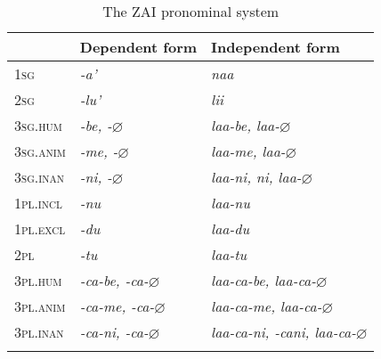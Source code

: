  \begin{table}
 \label{izpronounstable}
 \caption{The ZAI pronominal system}

\begin{tabular}{ l ll }
\lsptoprule
 & Dependent form & Independent form \\

\midrule
1\textsc{sg} & \emph{-a'} & \emph{naa} \\

 
2\textsc{sg} & \emph{-lu'} & \emph{lii} \\

 
3\textsc{sg.hum} & \emph{-be, -$\varnothing$} & \emph{laa-be, laa-$\varnothing$} \\

 
3\textsc{sg.anim} & \emph{-me, -$\varnothing$} & \emph{laa-me, laa-$\varnothing$} \\

 
3\textsc{sg.inan} &  \emph{-ni, -$\varnothing$} & \emph{laa-ni, ni, laa-$\varnothing$} \\

 
1\textsc{pl.incl} & \emph{-nu} & \emph {laa-nu} \\

 
1\textsc{pl.excl} & \emph{-du} & \emph {laa-du} \\

 
2\textsc{pl} & \emph{-tu} & \emph {laa-tu} \\

 
3\textsc{pl.hum} &  \emph{-ca-be, -ca-$\varnothing$} & \emph {laa-ca-be, laa-ca-$\varnothing$} \\

 
3\textsc{pl.anim} &\emph{-ca-me, -ca-$\varnothing$} & \emph{laa-ca-me, laa-ca-$\varnothing$} \\

 
3\textsc{pl.inan} &  \emph{-ca-ni, -ca-$\varnothing$} & \emph{laa-ca-ni, -cani, laa-ca-$\varnothing$} \\

\lspbottomrule
\end{tabular} 
 \end{table}

